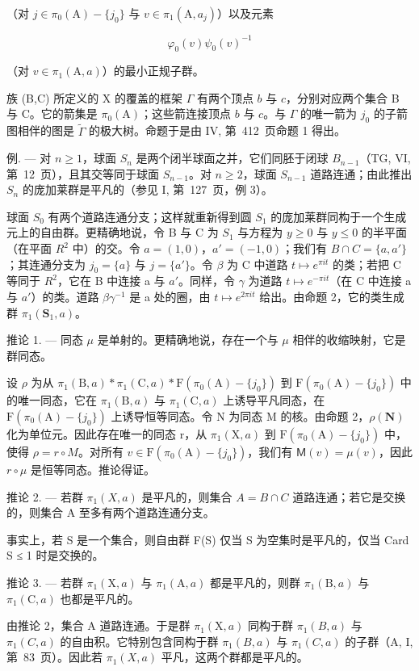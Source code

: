 （对 \(j\in \pi_0(\mathrm{A}) - \{j_0\}\) 与 \(v\in \pi_1(\mathrm{A},a_j)\)）以及元素

\[
\varphi_ {0} (v) \psi_ {0} (v) ^ {- 1}
\]

（对 \(v \in \pi_1(\mathrm{A}, a)\)）的最小正规子群。

族 (B,C) 所定义的 X 的覆盖的框架 \(\Gamma\) 有两个顶点 \(b\) 与 \(c\)，分别对应两个集合 B 与 C。它的箭集是 \(\pi_0(\mathrm{A})\)；这些箭连接顶点 \(b\) 与 \(c\)。与 \(\Gamma\) 的唯一箭为 \(j_0\) 的子箭图相伴的图是 \(\widetilde{\Gamma}\) 的极大树。命题于是由 IV, 第~412~页命题 1 得出。

例. --- 对 \(n \geqslant 1\)，球面 \(S_{n}\) 是两个闭半球面之并，它们同胚于闭球 \(B_{n-1}\)（TG, VI, 第~12~页），且其交等同于球面 \(S_{n-1}\)。对 \(n \geqslant 2\)，球面 \(S_{n-1}\) 道路连通；由此推出 \(S_{n}\) 的庞加莱群是平凡的（参见 I, 第~127~页，例 3）。

球面 \(S_{0}\) 有两个道路连通分支；这样就重新得到圆 \(S_{1}\) 的庞加莱群同构于一个生成元上的自由群。更精确地说，令 B 与 C 为 \(S_{1}\) 与方程为 \(y \geqslant 0\) 与 \(y \leqslant 0\) 的半平面（在平面 \(R^{2}\) 中）的交。令 \(a = (1,0)\)，\(a' = (-1,0)\)；我们有 \(B \cap C = \{a, a'\}\)；其连通分支为 \(j_{0} = \{a\}\) 与 \(j = \{a'\}\)。令 \(\beta\) 为 C 中道路 \(t \mapsto e^{\pi it}\) 的类；若把 C 等同于 \(R^{2}\)，它在 B 中连接 a 与 \(a'\)。同样，令 \(\gamma\) 为道路 \(t \mapsto e^{-\pi it}\)（在 C 中连接 a 与 \(a'\)）的类。道路 \(\beta\gamma^{-1}\) 是 a 处的圈，由 \(t \mapsto e^{2\pi it}\) 给出。由命题 2，它的类生成群 \(\pi_{1}(\mathbf{S}_{1}, a)\)。

推论 1. --- 同态 \(\mu\) 是单射的。更精确地说，存在一个与 \(\mu\) 相伴的收缩映射，它是群同态。

设 \(\rho\) 为从 \(\pi_1(\mathrm{B},a)*\pi_1(\mathrm{C},a)*\mathrm{F}(\pi_0(\mathrm{A})-\{j_0\})\) 到 \(\mathrm{F}(\pi_0(\mathrm{A}) - \{j_0\})\) 中的唯一同态，它在 \(\pi_1(\mathrm{B},a)\) 与 \(\pi_1(\mathrm{C},a)\) 上诱导平凡同态，在 \(\mathrm{F}(\pi_0(\mathrm{A}) - \{j_0\})\) 上诱导恒等同态。令 N 为同态 M 的核。由命题 2，\(\rho (\mathbf{N})\) 化为单位元。因此存在唯一的同态 r，从 \(\pi_1(\mathrm{X},a)\) 到 \(\mathrm{F}(\pi_0(\mathrm{A}) - \{j_0\})\) 中，使得 \(\rho = r\circ M\)。对所有 \(v\in \mathrm{F}(\pi_0(\mathrm{A}) - \{j_0\})\)，我们有 \(\mathsf{M}(v) = \mu (v)\)，因此 \(r\circ \mu\) 是恒等同态。推论得证。

推论 2. --- 若群 \(\pi_{1}(X,a)\) 是平凡的，则集合 \(A = B \cap C\) 道路连通；若它是交换的，则集合 A 至多有两个道路连通分支。

事实上，若 S 是一个集合，则自由群 F(S) 仅当 S 为空集时是平凡的，仅当 Card S ≤ 1 时是交换的。

推论 3. --- 若群 \(\pi_1(\mathrm{X},a)\) 与 \(\pi_1(\mathrm{A},a)\) 都是平凡的，则群 \(\pi_1(\mathrm{B},a)\) 与 \(\pi_1(\mathrm{C},a)\) 也都是平凡的。

由推论 2，集合 A 道路连通。于是群 \(\pi_1(\mathrm{X},a)\) 同构于群 \(\pi_{1}(B,a)\) 与 \(\pi_{1}(C,a)\) 的自由积。它特别包含同构于群 \(\pi_{1}(B,a)\) 与 \(\pi_{1}(C,a)\) 的子群（A, I, 第~83~页）。因此若 \(\pi_{1}(X,a)\) 平凡，这两个群都是平凡的。

